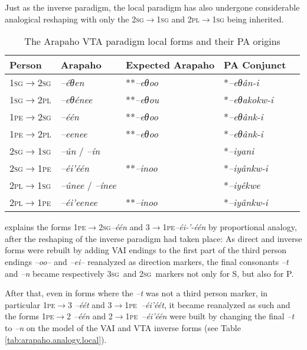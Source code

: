 \documentclass[twoside,a4paper,11pt]{article}
\newcommand{\ipa}[1]{{\phon\textit{#1}}}
\newcommand{\sg}{\textsc{sg}}
\newcommand{\pl}{\textsc{pl}}
\newcommand{\grise}[1]{\cellcolor{lightgray}\textbf{#1}}
\newcommand{\Σ}{\greek{Σ}}
\newcommand{\pe}{\textsc{pe}}
\begin{document}
Just as the inverse paradigm, the local paradigm has also undergone considerable analogical reshaping with only the 2\sg{}$\rightarrow$1\sg{} and 2\pl{}$\rightarrow$1\sg{} being inherited. 

\begin{table}[H]
\caption{The Arapaho VTA paradigm local forms and their PA origins}
\centering \label{tab:vta.3}
\begin{tabular}{lllll}
\toprule
Person & Arapaho & Expected Arapaho&PA Conjunct    \\
\midrule
1\sg$\rightarrow$2\sg & \ipa{--éθen} \grise{}& **\ipa{--eθoo} &*\ipa{--eθân-i}   \\
1\sg$\rightarrow$2\pl &\ipa{--eθénee} \grise{}& **\ipa{--eθou} &*\ipa{--eθakokw-i} & \\
1\pe$\rightarrow$2\sg &\ipa{--één} \grise{}& **\ipa{--eθoo} &*\ipa{--eθânk-i} &   \\
1\pe$\rightarrow$2\pl &\ipa{--eenee} \grise{}& **\ipa{--eθoo} &*\ipa{--eθânk-i} &   \\
\midrule 
2\sg$\rightarrow$1\sg &\ipa{--ún} / \ipa{--ín} &   & *\ipa{--iyani}     \\
2\sg$\rightarrow$1\pe & \ipa{--éi'één}\grise{}& **\ipa{--inoo}&*\ipa{--iyânkw-i} &  \\
2\pl$\rightarrow$1\sg &\ipa{--únee} / \ipa{--ínee} &  &*\ipa{--iyêkwe} &   \\
2\pl$\rightarrow$1\pe &\ipa{--éi'eenee}\grise{} & **\ipa{--inoo}&*\ipa{--iyânkw-i} &   \\
\bottomrule
\end{tabular}
\end{table}

\citet[23]{goddard65arapaho} explains the forms 1\pe$\rightarrow$2\sg \ipa{--één} and 3$\rightarrow$1\pe \ipa{--éi-'-één} by proportional analogy, after the reshaping of the inverse paradigm had taken place: As direct and inverse forms were rebuilt by adding VAI endings to the first part of the third person endings \ipa{--oo--} and \ipa{--ei--} reanalyzed as direction markers, the final consonants \ipa{--t} and \ipa{--n} became   respectively 3\sg\ and 2\sg\ markers not only for  S, but also for P.

After that, even in forms where the \ipa{--t} was not a third person marker, in particular  1\pe$\rightarrow$3   \ipa{--éét} and   3$\rightarrow$1\pe\   \ipa{--éi'éét}, it became reanalyzed as such and the forms  1\pe$\rightarrow$2   \ipa{--één} and   2$\rightarrow$1\pe\   \ipa{--éi'één} were built by changing the final \ipa{--t} to \ipa{--n} on the model of the VAI and VTA inverse forms (see Table  \ref{tab:arapaho.analogy.local}).
\end{document}
